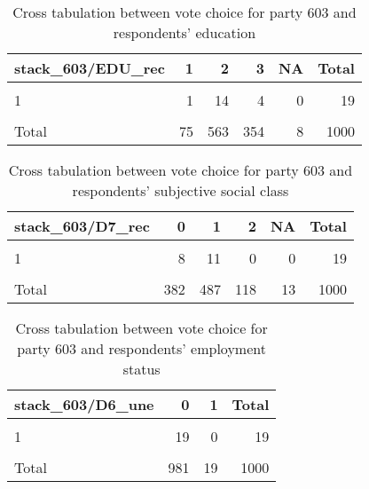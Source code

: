 \documentclass[
]{article}
\begin{document}
\begin{table}

\caption{\label{tab:unnamed-chunk-28}Cross tabulation between vote choice for party 603 and respondents' education 
                   \label{table:crosstab_1_cz}}
\centering
\begin{tabular}[t]{l|r|r|r|r|r}
\hline
stack\_603/EDU\_rec & 1 & 2 & 3 & NA & Total\\
\hline
\cellcolor{gray!6}{0} & \cellcolor{gray!6}{71} & \cellcolor{gray!6}{542} & \cellcolor{gray!6}{343} & \cellcolor{gray!6}{7} & \cellcolor{gray!6}{963}\\
\hline
1 & 1 & 14 & 4 & 0 & 19\\
\hline
\cellcolor{gray!6}{NA} & \cellcolor{gray!6}{3} & \cellcolor{gray!6}{7} & \cellcolor{gray!6}{7} & \cellcolor{gray!6}{1} & \cellcolor{gray!6}{18}\\
\hline
Total & 75 & 563 & 354 & 8 & 1000\\
\hline
\end{tabular}
\end{table}

\begin{table}

\caption{\label{tab:unnamed-chunk-28}Cross tabulation between vote choice for party 603 and respondents' subjective social class
                   \label{table:crosstab_2_cz}}
\centering
\begin{tabular}[t]{l|r|r|r|r|r}
\hline
stack\_603/D7\_rec & 0 & 1 & 2 & NA & Total\\
\hline
\cellcolor{gray!6}{0} & \cellcolor{gray!6}{366} & \cellcolor{gray!6}{467} & \cellcolor{gray!6}{118} & \cellcolor{gray!6}{12} & \cellcolor{gray!6}{963}\\
\hline
1 & 8 & 11 & 0 & 0 & 19\\
\hline
\cellcolor{gray!6}{NA} & \cellcolor{gray!6}{8} & \cellcolor{gray!6}{9} & \cellcolor{gray!6}{0} & \cellcolor{gray!6}{1} & \cellcolor{gray!6}{18}\\
\hline
Total & 382 & 487 & 118 & 13 & 1000\\
\hline
\end{tabular}
\end{table}

\begin{table}

\caption{\label{tab:unnamed-chunk-28}Cross tabulation between vote choice for party 603 and respondents' employment status 
                   \label{table:crosstab_3_cz}}
\centering
\begin{tabular}[t]{l|r|r|r}
\hline
stack\_603/D6\_une & 0 & 1 & Total\\
\hline
\cellcolor{gray!6}{0} & \cellcolor{gray!6}{945} & \cellcolor{gray!6}{18} & \cellcolor{gray!6}{963}\\
\hline
1 & 19 & 0 & 19\\
\hline
\cellcolor{gray!6}{NA} & \cellcolor{gray!6}{17} & \cellcolor{gray!6}{1} & \cellcolor{gray!6}{18}\\
\hline
Total & 981 & 19 & 1000\\
\hline
\end{tabular}
\end{table}
\end{document}
